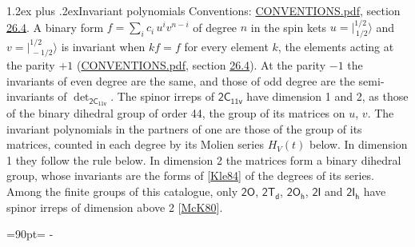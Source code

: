 \documentclass[10pt,a4paper]{article}
\makeatletter
\renewcommand\section{\@startsection{section}{1}{\z@}{-3ex plus -1ex minus -.2ex}%
  {1.2ex plus .2ex}{\normalfont\large\sffamily\bfseries\color{parttitle}}}
\newcommand{\needspace}[1]{\par\penalty-100\begingroup\dimen0=#1\relax\dimen2=\pagegoal
  \advance\dimen2-\pagetotal\ifdim\dimen0>\dimen2\relax\ifdim\dimen2>0pt\vfil\break\fi\fi
  \endgroup}
\numberwithin{equation}{section}
\newcommand{\grp}[1]{\mathsf{#1}}
\newcommand{\jm}[2]{\bigl\lvert{}^{#1}_{\,#2}\bigr\rangle}
\makeatother
\begin{document}
\section{Invariant polynomials}\label{s:invariants}
Conventions: \href{../../CONVENTIONS.pdf}{CONVENTIONS.pdf}, section \href{../../CONVENTIONS.pdf\#conv.26.4}{26.4}.
\leavevmode\label{n:local.binary.form}A binary form $f = \sum_i c_i\, u^i v^{n-i}$ of degree $n$ in the spin kets $u = \jm{1/2}{1/2}$ and $v = \jm{1/2}{-1/2}$ is invariant when $k f = f$ for every element $k$, the elements acting at the parity $+1$ (\href{../../CONVENTIONS.pdf}{CONVENTIONS.pdf}, section \href{../../CONVENTIONS.pdf\#conv.26.4}{26.4}). At the parity $-1$ the invariants of even degree are the same, and those of odd degree are the semi-invariants of $\det_{\grp{2C_{11v}}}$.
The spinor irreps of $\grp{2C_{11v}}$ have dimension 1 and 2, as those of the binary dihedral group of order 44, the group of its matrices on $u$, $v$. \label{n:function.hilbert}The invariant polynomials in the partners of one are those of the group of its matrices, counted in each degree by its Molien series $H_V(t)$ below. In dimension 1 they follow the rule below. In dimension 2 the matrices form a binary dihedral group, whose invariants are the forms of [\href{../../../REFERENCES.pdf\#ref.Kle84}{Kle84}] of the degrees of its series. Among the finite groups of this catalogue, only $\grp{2O}$, $\grp{2T_{d}}$, $\grp{2O_{h}}$, $\grp{2I}$ and $\grp{2I_{h}}$ have spinor irreps of dimension above 2 [\href{../../../REFERENCES.pdf\#ref.McK80}{McK80}].
\needspace{90pt}
\end{document}
